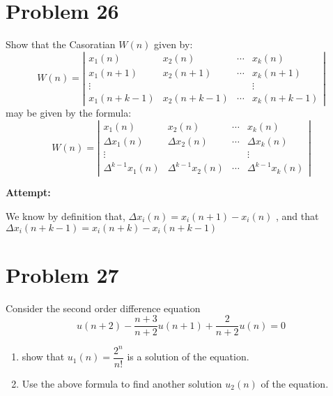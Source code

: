\documentclass[12pt,letterpaper]{article}
\theoremstyle{definition}
\begin{document}
\section*{Problem 26}

Show that the Casoratian $W(n)$ given by:
\begin{equation}
    W(n) = \left|\begin{matrix}
        x_1(n) & x_2(n) &  \cdots & x_k(n) \\
        x_1(n+1) & x_2(n+1) & \cdots & x_k(n+1)\\
        \vdots & & & \vdots\\
        x_1(n+k-1) & x_2 (n+k-1) & \cdots & x_k(n+k-1)
    \end{matrix}\right|
\end{equation}
may be given by the formula:
\begin{equation*}
    W(n) = \left|\begin{matrix}
        x_1(n) & x_2(n) & \cdots & x_k(n)\\
        \Delta x_1(n) & \Delta x_2(n) & \cdots & \Delta x_k(n)\\
        \vdots & & & \vdots \\
        \Delta^{k-1}x_1(n) & \Delta^{k-1} x_2 (n) & \cdots & \Delta^{k-1} x_k(n)
    \end{matrix}\right|
\end{equation*}



\textbf{Attempt:}
\begin{changemargin}{.5cm}{0cm}

We know by definition that,  $\Delta x_i(n)=x_i(n+1)- x_i(n)$ , and that $\Delta x_i(n+k-1)=x_i(n+k)-x_i(n+k-1)$

\end{changemargin}

\newpage

\section*{Problem 27}

Consider the second order difference equation 
\begin{equation*}
    u(n+2) - \dfrac{n+3}{n+2}u(n+1) + \dfrac{2}{n+2}u(n) = 0
\end{equation*}

\begin{enumerate}[label = (\alph*)]
    \item show that $\displaystyle u_1(n)= \dfrac{2^n}{n!}$ is a solution of the equation.
    \item Use the above formula to find another solution $u_2(n)$ of the equation.
\end{enumerate}
\end{document}
